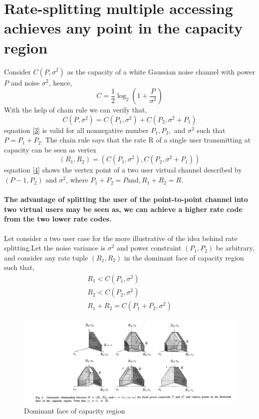 \documentclass{article}
\begin{document}
\section{Rate-splitting multiple accessing achieves any point in the capacity region}
Consider $C(P, \sigma^2)$ as the capacity of  a white Gaussian noise channel with power $P$ and  noise $\sigma^2$, hence,
\begin{equation}
	C = \frac{1}{2}\log_2\left( 1 + \frac{P}{\sigma^2}\right)
\end{equation}
With the help of chain rule we can verify that,
\begin{equation}
	C(P, \sigma^2) = C(P_1, \sigma^2) + C(P_2, \sigma^2 + P_1) \label{3}
\end{equation}
equation \eqref{3} is valid for all nonnegative number $P_1, P_2,$ and $\sigma^2$ such that $P = P_1 + P_2$. The chain rule says that the rate R of a single user transmitting at capacity can be seen as vertex 
\begin{equation}
	\left( R_1, R_2 \right) = \left( C(P_1, \sigma^2), C(P_2, \sigma^2+P_1)\right) \label{4}
\end{equation} \cite{3}
equation \eqref{4} shows the vertex point of a two user virtual channel described by $\left(P-1, P
_2\right)$ and $\sigma^2$, where $P_1 + P_2 = P\text{and}, R_1 +R_2 = R$.\paragraph{ The advantage of splitting the user of the point-to-point channel into two virtual users may be seen as, we can achieve a higher rate code from the two lower rate codes.}
\flushleft Let consider a two user case for the more illustrative of the idea behind rate splitting.Let the noise variance is $\sigma^2$ and power constraint $\left( P_1 ,P_2\right)$ be arbitrary, and consider any rate tuple $(R_1, R_2)$ in the dominant face of capacity region\cite{4} such that,
\begin{align*}
	R_1< C(P_1, \sigma^2)\\
	R_2 < C(P_2, \sigma^2) \\
	R_1+ R_2 = C(P_1 +P_2 , \sigma^2)
\end{align*}
\begin{center}

	\begin{figure}[htb!]
		\centering
		\includegraphics[height=.3 \textheight]{fig_11.png}
		\caption{Dominant face of capacity region}
		\label{fig11}
	\end{figure}
\end{center}
\end{document}
